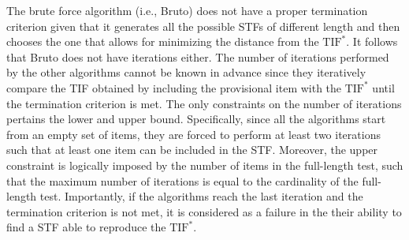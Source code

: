 \documentclass[12pt, a4paper, titilepage]{article}
\begin{document}
 

The brute force algorithm (i.e., Bruto) does not have a proper termination criterion given that it generates all the possible STFs of different length and then chooses the one that allows for minimizing the distance from the $\text{TIF}^*$. It follows that Bruto does not have iterations either. 
The number of iterations performed by the other algorithms cannot be known in advance since they iteratively compare the TIF obtained by including the provisional item with the $\text{TIF}^*$ until the termination criterion is met. 
The only constraints on the number of iterations pertains the lower and upper bound. 
 Specifically, since all the algorithms start from an empty set of items, they are forced to perform at least two iterations such that at least one item can be included in the STF. Moreover, the upper constraint is logically imposed by the number of items in the full-length test, such that the maximum number of iterations is equal to the cardinality of the full-length test. Importantly, if the algorithms reach the last iteration and the termination criterion is not met, it is considered as a failure in the their ability to find a STF able to reproduce the $\text{TIF}^*$.
\end{document}
